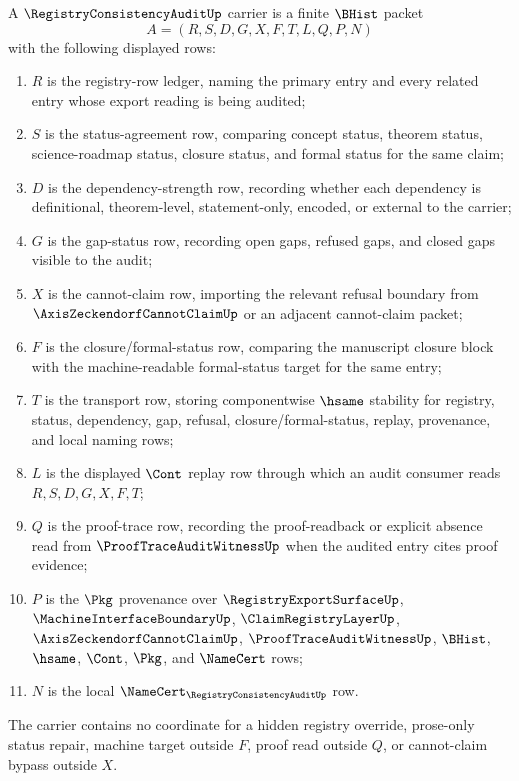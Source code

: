 \begin{definition}
\label{def:registry-consistency-audit-carrier}
A $\RegistryConsistencyAuditUp$ carrier is a finite $\BHist$ packet
$$
A=(R,S,D,G,X,F,T,L,Q,P,N)
$$
with the following displayed rows:
\begin{enumerate}
\item $R$ is the registry-row ledger, naming the primary entry and every related entry whose export reading is being audited;
\item $S$ is the status-agreement row, comparing concept status, theorem status, science-roadmap status, closure status, and formal status for the same claim;
\item $D$ is the dependency-strength row, recording whether each dependency is definitional, theorem-level, statement-only, encoded, or external to the carrier;
\item $G$ is the gap-status row, recording open gaps, refused gaps, and closed gaps visible to the audit;
\item $X$ is the cannot-claim row, importing the relevant refusal boundary from $\AxisZeckendorfCannotClaimUp$ or an adjacent cannot-claim packet;
\item $F$ is the closure/formal-status row, comparing the manuscript closure block with the machine-readable formal-status target for the same entry;
\item $T$ is the transport row, storing componentwise $\hsame$ stability for registry, status, dependency, gap, refusal, closure/formal-status, replay, provenance, and local naming rows;
\item $L$ is the displayed $\Cont$ replay row through which an audit consumer reads $R,S,D,G,X,F,T$;
\item $Q$ is the proof-trace row, recording the proof-readback or explicit absence read from $\ProofTraceAuditWitnessUp$ when the audited entry cites proof evidence;
\item $P$ is the $\Pkg$ provenance over $\RegistryExportSurfaceUp$, $\MachineInterfaceBoundaryUp$, $\ClaimRegistryLayerUp$, $\AxisZeckendorfCannotClaimUp$, $\ProofTraceAuditWitnessUp$, $\BHist$, $\hsame$, $\Cont$, $\Pkg$, and $\NameCert$ rows;
\item $N$ is the local $\NameCert_{\RegistryConsistencyAuditUp}$ row.
\end{enumerate}
The carrier contains no coordinate for a hidden registry override, prose-only status repair, machine target outside $F$, proof read outside $Q$, or cannot-claim bypass outside $X$.
\end{definition}

